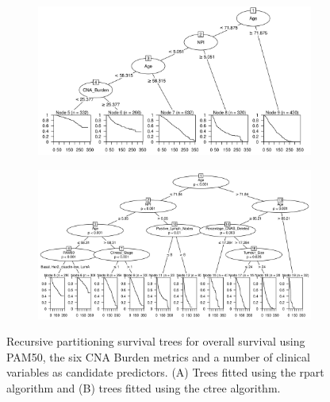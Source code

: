\begin{figure}[!htb]
\centering

\vspace{1cm}

\begin{subfigure}{\textwidth}
\subcaption{}
\includegraphics[width=1\textwidth]{../figures/Appendices/Appendix_B/Clin_PartyKit_Survival_Burden_OS_PAM50.png}
\end{subfigure}

\vspace{2cm}

\begin{subfigure}{\textwidth}
\subcaption{}
\includegraphics[width=1\textwidth]{../figures/Appendices/Appendix_B/Clin_Ctree_Survival_Burden_OS_PAM50.png}
\end{subfigure}

\vspace{1cm}

\caption[Recursive partitioning survival trees for overall survival using PAM50, the six CNA Burden metrics and a number of clinical variables as candidate predictors.]{Recursive partitioning survival trees for overall survival using PAM50, the six CNA Burden metrics and a number of clinical variables as candidate predictors. (A) Trees fitted using the rpart algorithm and (B) trees fitted using the ctree algorithm.}
\end{figure}

